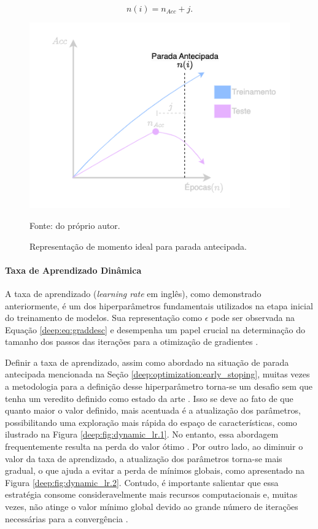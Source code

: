 \begin{equation}
    \label{deep:eq:early_stopping}
    n(i) = n_{Acc} + j.
\end{equation}


\begin{figure}[H]
    \centering
    \caption{Representação de momento ideal para parada antecipada.}
    \includegraphics[width=0.6\linewidth]{recursos/imagens/deep/early_stopping.png}
    \label{deep:fig:earlystopping}

    Fonte: do próprio autor.
\end{figure}

\paragraph{Taxa de Aprendizado Dinâmica}
\label{deep:optimization:dynamic_lr}

A taxa de aprendizado (\textit{learning rate} em inglês), como demonstrado anteriormente, é um dos hiperparâmetros fundamentais utilizados na etapa inicial do treinamento de modelos. Sua representação como $\epsilon$ pode ser observada na Equação \ref{deep:eq:graddesc} e desempenha um papel crucial na determinação do tamanho dos passos das iterações para a otimização de gradientes \citep{Smith2017CyclicalNetworks}.

Definir a taxa de aprendizado, assim como abordado na situação de parada antecipada mencionada na Seção \ref{deep:optimization:early_stoping}, muitas vezes a metodologia para a definição desse hiperparâmetro torna-se um desafio sem que tenha um veredito definido como estado da arte \citep{Goodfellow2016}. Isso se deve ao fato de que quanto maior o valor definido, mais acentuada é a atualização dos parâmetros, possibilitando uma exploração mais rápida do espaço de características, como ilustrado na Figura \ref{deep:fig:dynamic_lr.1}. No entanto, essa abordagem frequentemente resulta na perda do valor ótimo \citep{Tang2021AnPump}. Por outro lado, ao diminuir o valor da taxa de aprendizado, a atualização dos parâmetros torna-se mais gradual, o que ajuda a evitar a perda de mínimos globais, como apresentado na Figura \ref{deep:fig:dynamic_lr.2}. Contudo, é importante salientar que essa estratégia consome consideravelmente mais recursos computacionais e, muitas vezes, não atinge o valor mínimo global devido ao grande número de iterações necessárias para a convergência \citep{Tang2021AnPump}.

